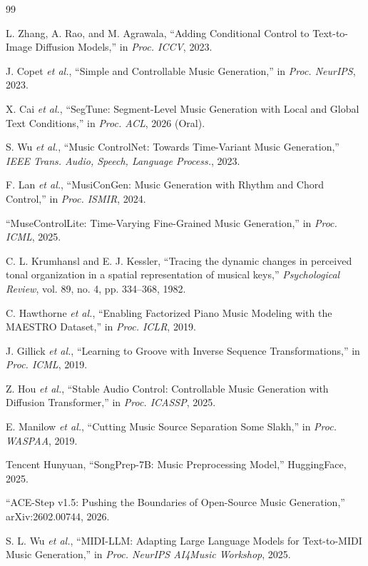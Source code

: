 \documentclass[UTF8,12pt,a4paper]{ctexart}
\begin{document}
\begin{thebibliography}{99}

L. Zhang, A. Rao, and M. Agrawala, ``Adding Conditional Control to Text-to-Image Diffusion Models,'' in \textit{Proc. ICCV}, 2023.

J. Copet \textit{et al.}, ``Simple and Controllable Music Generation,'' in \textit{Proc. NeurIPS}, 2023.

X. Cai \textit{et al.}, ``SegTune: Segment-Level Music Generation with Local and Global Text Conditions,'' in \textit{Proc. ACL}, 2026 (Oral).

S. Wu \textit{et al.}, ``Music ControlNet: Towards Time-Variant Music Generation,'' \textit{IEEE Trans. Audio, Speech, Language Process.}, 2023.

F. Lan \textit{et al.}, ``MusiConGen: Music Generation with Rhythm and Chord Control,'' in \textit{Proc. ISMIR}, 2024.

``MuseControlLite: Time-Varying Fine-Grained Music Generation,'' in \textit{Proc. ICML}, 2025.

C. L. Krumhansl and E. J. Kessler, ``Tracing the dynamic changes in perceived tonal organization in a spatial representation of musical keys,'' \textit{Psychological Review}, vol. 89, no. 4, pp. 334--368, 1982.

C. Hawthorne \textit{et al.}, ``Enabling Factorized Piano Music Modeling with the MAESTRO Dataset,'' in \textit{Proc. ICLR}, 2019.

J. Gillick \textit{et al.}, ``Learning to Groove with Inverse Sequence Transformations,'' in \textit{Proc. ICML}, 2019.

Z. Hou \textit{et al.}, ``Stable Audio Control: Controllable Music Generation with Diffusion Transformer,'' in \textit{Proc. ICASSP}, 2025.

E. Manilow \textit{et al.}, ``Cutting Music Source Separation Some Slakh,'' in \textit{Proc. WASPAA}, 2019.

Tencent Hunyuan, ``SongPrep-7B: Music Preprocessing Model,'' HuggingFace, 2025.

``ACE-Step v1.5: Pushing the Boundaries of Open-Source Music Generation,'' arXiv:2602.00744, 2026.

S. L. Wu \textit{et al.}, ``MIDI-LLM: Adapting Large Language Models for Text-to-MIDI Music Generation,'' in \textit{Proc. NeurIPS AI4Music Workshop}, 2025.

\end{thebibliography}
\end{document}
